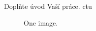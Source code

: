 \begin{introduction}
	Doplňte úvod Vaší práce.  \gls{ctu}
	
	\blind[2]
	
    \begin{figure}
        \centering
        \caption{One image. }
        \label{fig:TODO}
    \end{figure}
	
\end{introduction}